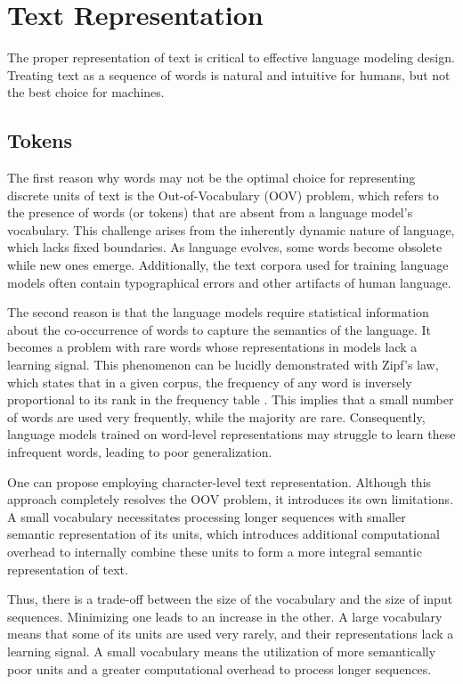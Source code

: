 \section{Text Representation}

The proper representation of text is critical to effective language modeling design. Treating text as a sequence of words is natural and intuitive for humans, but not the best choice for machines.

\subsection{Tokens}\label{sec:tokens}

The first reason why words may not be the optimal choice for representing discrete units of text is the Out-of-Vocabulary (OOV) problem, which refers to the presence of words (or tokens) that are absent from a language model's vocabulary. This challenge arises from the inherently dynamic nature of language, which lacks fixed boundaries. As language evolves, some words become obsolete while new ones emerge. Additionally, the text corpora used for training language models often contain typographical errors and other artifacts of human language.

The second reason is that the language models require statistical information about the co-occurrence of words to capture the semantics of the language. It becomes a problem with rare words whose representations in models lack a learning signal. This phenomenon can be lucidly demonstrated with Zipf's law, which states that in a given corpus, the frequency of any word is inversely proportional to its rank in the frequency table \parencite{estoup1916}. This implies that a small number of words are used very frequently, while the majority are rare. Consequently, language models trained on word-level representations may struggle to learn these infrequent words, leading to poor generalization.

One can propose employing character-level text representation. Although this approach completely resolves the OOV problem, it introduces its own limitations. A small vocabulary necessitates processing longer sequences with smaller semantic representation of its units, which introduces additional computational overhead to internally combine these units to form a more integral semantic representation of text.

Thus, there is a trade-off between the size of the vocabulary and the size of input sequences. Minimizing one leads to an increase in the other. A large vocabulary means that some of its units are used very rarely, and their representations lack a learning signal. A small vocabulary means the utilization of more semantically poor units and a greater computational overhead to process longer sequences.

